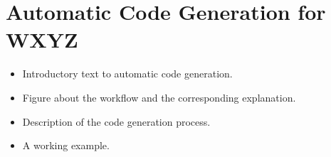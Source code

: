 \section{Automatic Code Generation for WXYZ} 
\label{sec:code-generation}


\begin{itemize}
    \item Introductory text to automatic code generation.
    \item Figure about the workflow and the corresponding explanation.
    \item Description of the code generation process.
    \item A working example. 
\end{itemize}

\blindtext[8]

\newpage